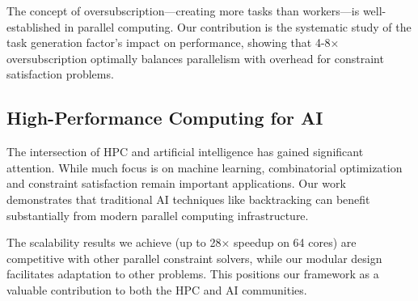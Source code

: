 The concept of oversubscription—creating more tasks than workers—is well-established in parallel computing. Our contribution is the systematic study of the task generation factor's impact on performance, showing that 4-8× oversubscription optimally balances parallelism with overhead for constraint satisfaction problems.

\subsection{High-Performance Computing for AI}
The intersection of HPC and artificial intelligence has gained significant attention. While much focus is on machine learning, combinatorial optimization and constraint satisfaction remain important applications. Our work demonstrates that traditional AI techniques like backtracking can benefit substantially from modern parallel computing infrastructure.

The scalability results we achieve (up to 28× speedup on 64 cores) are competitive with other parallel constraint solvers, while our modular design facilitates adaptation to other problems. This positions our framework as a valuable contribution to both the HPC and AI communities.